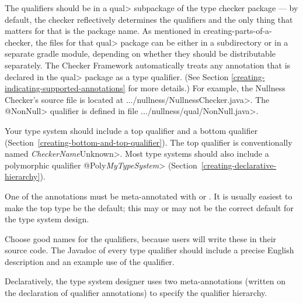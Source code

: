 The qualifiers should be in a \<qual> subpackage of the type checker package ---
by default, the checker reflectively determines the qualifiers and the only thing that matters for that is the package name.
As mentioned in {creating-parts-of-a-checker}, the files for that \<qual> package can be
either in a subdirectory or in a separate gradle module, depending on whether
they should be distributable separately.
The Checker Framework automatically treats any annotation that
is declared in the \<qual> package as a type qualifier.
(See Section \ref{creating-indicating-supported-annotations} for more details.)
For example, the Nullness Checker's source file is located at
\<.../nullness/NullnessChecker.java>. The \<@NonNull> qualifier is defined in
file \<.../nullness/qual/NonNull.java>.


Your type system should include a top qualifier and a bottom qualifier
(Section~\ref{creating-bottom-and-top-qualifier}).
The top qualifier is conventionally named \<\emph{CheckerName}Unknown>.
Most type systems should also include a
polymorphic qualifier \<@Poly\emph{MyTypeSystem}>
(Section~\ref{creating-declarative-hierarchy}).

One of the annotations must be meta-annotated with
 or
.
It is usually easiest to make the top type be the default; this may or may
not be the correct default for the type system design.

Choose good names for the qualifiers, because users will write these in
their source code.
The Javadoc of every type qualifier should include a precise English
description and an example use of the qualifier.



Declaratively, the type system designer uses two meta-annotations (written
on the declaration of qualifier annotations) to specify the qualifier
hierarchy.

